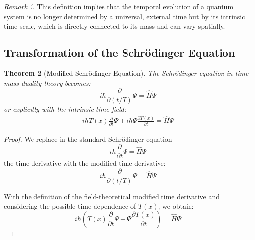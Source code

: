 \documentclass{article}
\newtheorem{theorem}{Theorem}[section]
\theoremstyle{definition}
\theoremstyle{remark}
\newtheorem{remark}[theorem]{Remark}
\newcommand{\Tfield}{T(x)} %
\begin{document}
	\begin{remark}
		This definition implies that the temporal evolution of a quantum system is no longer determined by a universal, external time but by its intrinsic time scale, which is directly connected to its mass and can vary spatially.
	\end{remark}
	
	\subsection{Transformation of the Schrödinger Equation}
	
	\begin{theorem}[Modified Schrödinger Equation]
		The Schrödinger equation in time-mass duality theory becomes:
		\begin{equation}
			i\hbar \frac{\partial}{\partial(t/T)}\Psi = \hat{H}\Psi
		\end{equation}
		or explicitly with the intrinsic time field:
		\begin{multline}
			i\hbar \Tfield\frac{\partial}{\partial t}\Psi + i\hbar\Psi\frac{\partial \Tfield}{\partial t} = \hat{H}\Psi
		\end{multline}
	\end{theorem}
	
	\begin{proof}
		We replace in the standard Schrödinger equation
		\begin{equation}
			i\hbar \frac{\partial}{\partial t}\Psi = \hat{H}\Psi
		\end{equation}
		the time derivative with the modified time derivative:
		\begin{equation}
			i\hbar \frac{\partial}{\partial(t/T)}\Psi = \hat{H}\Psi
		\end{equation}
		
		With the definition of the field-theoretical modified time derivative and considering the possible time dependence of $\Tfield$, we obtain:
		\begin{equation}
			i\hbar (\Tfield\frac{\partial}{\partial t}\Psi + \Psi\frac{\partial \Tfield}{\partial t}) = \hat{H}\Psi
		\end{equation}
	\end{proof}
	
\end{document}
